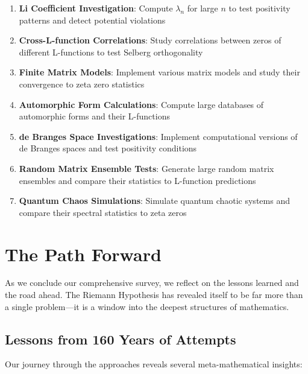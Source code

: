 \begin{experiment_list}
\begin{enumerate}
\item \textbf{Li Coefficient Investigation}: Compute $\lambda_n$ for large $n$ to test positivity patterns and detect potential violations

\item \textbf{Cross-L-function Correlations}: Study correlations between zeros of different L-functions to test Selberg orthogonality

\item \textbf{Finite Matrix Models}: Implement various matrix models and study their convergence to zeta zero statistics

\item \textbf{Automorphic Form Calculations}: Compute large databases of automorphic forms and their L-functions

\item \textbf{de Branges Space Investigations}: Implement computational versions of de Branges spaces and test positivity conditions

\item \textbf{Random Matrix Ensemble Tests}: Generate large random matrix ensembles and compare their statistics to L-function predictions

\item \textbf{Quantum Chaos Simulations}: Simulate quantum chaotic systems and compare their spectral statistics to zeta zeros
\end{enumerate}
\end{experiment_list}

\section{The Path Forward}
\label{sec:path_forward}

As we conclude our comprehensive survey, we reflect on the lessons learned and the road ahead. The Riemann Hypothesis has revealed itself to be far more than a single problem—it is a window into the deepest structures of mathematics.

\subsection{Lessons from 160 Years of Attempts}
\label{subsec:lessons_learned}

Our journey through the approaches reveals several meta-mathematical insights:

